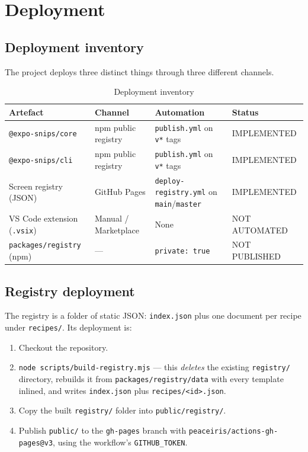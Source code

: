 \chapter{Deployment}
\label{ch:deployment}

\section{Deployment inventory}

The project deploys three distinct things through three different channels.

\begin{longtable}{p{3.6cm}p{3.2cm}p{4.2cm}p{3.2cm}}
\caption{Deployment inventory}\\
\toprule
\textbf{Artefact} & \textbf{Channel} & \textbf{Automation} & \textbf{Status} \\
\midrule

\texttt{@expo-snips/core} & npm public registry & \texttt{publish.yml} on \texttt{v*}
tags & IMPLEMENTED \\
\texttt{@expo-snips/cli} & npm public registry & \texttt{publish.yml} on \texttt{v*}
tags & IMPLEMENTED \\
Screen registry (JSON) & GitHub Pages & \texttt{deploy-registry.yml} on
\texttt{main}/\texttt{master} & IMPLEMENTED \\
VS Code extension (\texttt{.vsix}) & Manual / Marketplace & None & NOT AUTOMATED \\
\texttt{packages/registry} (npm) & --- & \texttt{private: true} & NOT PUBLISHED \\
\bottomrule
\end{longtable}

\section{Registry deployment}

The registry is a folder of static JSON: \texttt{index.json} plus one document
per recipe under \texttt{recipes/}. Its deployment is:

\begin{enumerate}
  \item Checkout the repository.
  \item \texttt{node scripts/build-registry.mjs} --- this \emph{deletes} the
        existing \texttt{registry/} directory, rebuilds it from
        \texttt{packages/registry/data} with every template inlined, and writes
        \texttt{index.json} plus \texttt{recipes/<id>.json}.
  \item Copy the built \texttt{registry/} folder into \texttt{public/registry/}.
  \item Publish \texttt{public/} to the \texttt{gh-pages} branch with
        \texttt{peaceiris/actions-gh-pages@v3}, using the workflow's
        \texttt{GITHUB\_TOKEN}.
\end{enumerate}

